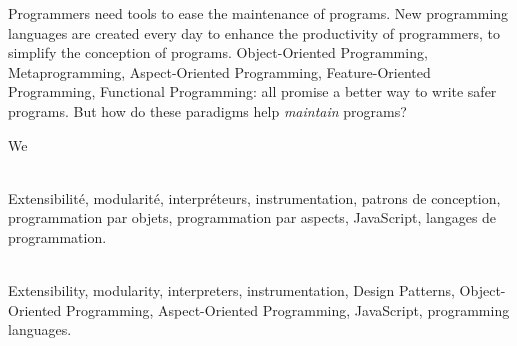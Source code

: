 \begin{titlepage}
\begin{addmargin}[-1cm]{-4cm}
\begin{minipage}[t]{9cm}
Programmers need tools to ease the maintenance of programs.  New programming
languages are created every day to enhance the productivity of programmers, to
simplify the conception of programs.  Object-Oriented Programming,
Metaprogramming, Aspect-Oriented Programming, Feature-Oriented Programming,
Functional Programming: all promise a better way to write safer programs.  But
how do these paradigms help \emph{maintain} programs?

We
\end{minipage}

\vfill
\noindent
\begin{minipage}[t]{9cm}
\\
Extensibilité, modularité, interpréteurs, instrumentation, patrons de
conception, programmation par objets, programmation par aspects, JavaScript,
langages de programmation.
\end{minipage}%
\hspace{1cm}
\begin{minipage}[t]{9cm}
\\
Extensibility, modularity, interpreters, instrumentation, Design Patterns,
Object-Oriented Programming, Aspect-Oriented Programming, JavaScript,
programming languages.
\end{minipage}
\end{addmargin}
\end{titlepage}


